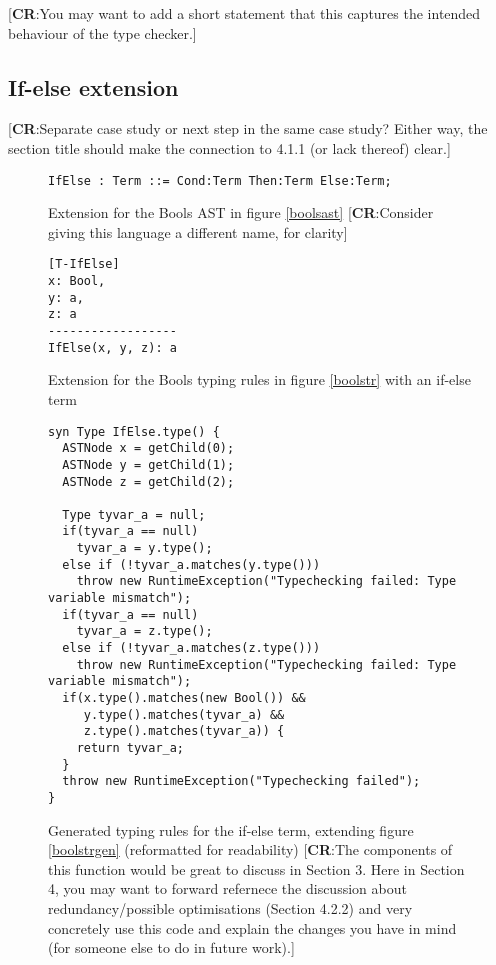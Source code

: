 \documentclass[nofilelist]{cslthse-msc}
\newcommand{\CR}[1]{\textcolor{green!60!black}{[\textbf{CR}:#1]}}
\begin{document}
\CR{You may want to add a short statement that this captures the intended behaviour of the type checker.}

\subsection{If-else extension}

\CR{Separate case study or next step in the same case study?  Either way, the section title should make the connection to 4.1.1 (or lack thereof) clear.}

\begin{figure}[h]
\begin{lstlisting}[]
IfElse : Term ::= Cond:Term Then:Term Else:Term;
\end{lstlisting}
  \caption{Extension for the Bools AST in figure \ref{boolsast} \CR{Consider giving this language a different name, for clarity}}
  \label{ifelseast}
\end{figure}

\begin{figure}[h]
\begin{lstlisting}[]
[T-IfElse]
x: Bool,
y: a,
z: a
------------------
IfElse(x, y, z): a
\end{lstlisting}
  \caption{Extension for the Bools typing rules in figure \ref{boolstr} with an if-else term}
  \label{ifelsetr}
\end{figure}
\begin{figure}[h]
\begin{lstlisting}[language=jrag]
syn Type IfElse.type() {
  ASTNode x = getChild(0);
  ASTNode y = getChild(1);
  ASTNode z = getChild(2);

  Type tyvar_a = null;
  if(tyvar_a == null)
    tyvar_a = y.type();
  else if (!tyvar_a.matches(y.type()))
    throw new RuntimeException("Typechecking failed: Type variable mismatch");
  if(tyvar_a == null)
    tyvar_a = z.type();
  else if (!tyvar_a.matches(z.type()))
    throw new RuntimeException("Typechecking failed: Type variable mismatch");
  if(x.type().matches(new Bool()) &&
     y.type().matches(tyvar_a) &&
     z.type().matches(tyvar_a)) {
    return tyvar_a;
  }
  throw new RuntimeException("Typechecking failed");
}
\end{lstlisting}
\caption{Generated typing rules for the if-else term, extending figure \ref{boolstrgen} (reformatted for readability)
  \CR{The components of this function would be great to discuss in Section 3.  Here in Section 4, you may want to forward refernece the discussion about redundancy/possible optimisations (Section 4.2.2) and very concretely use this code and explain the changes you have in mind (for someone else to do in future work).}
}
  \label{ifelsetrgen}
\end{figure}
\end{document}
